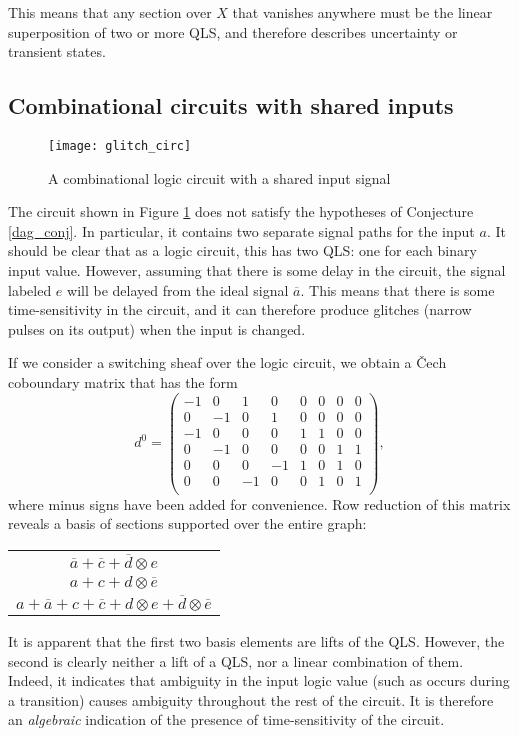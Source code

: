 \documentclass{amsart}
\theoremstyle{plain}
\theoremstyle{definition}
\begin{document}
This means that any section over $X$ that vanishes anywhere must be
the linear superposition of two or more QLS, and therefore describes
uncertainty or transient states.  

\subsection{Combinational circuits with shared inputs}

\begin{figure}
\begin{center}
\texttt{[image: glitch\_circ]}
\caption{A combinational logic circuit with a shared input signal}
\label{glitch_circ_fig}
\end{center}
\end{figure}

The circuit shown in Figure \ref{glitch_circ_fig} does not satisfy the
hypotheses of Conjecture \ref{dag_conj}.  In particular, it contains
two separate signal paths for the input $a$.  It should be clear that
as a logic circuit, this has two QLS: one for each binary input value.
However, assuming that there is some delay in the circuit, the signal
labeled $e$ will be delayed from the ideal signal $\overline{a}$.
This means that there is some time-sensitivity in the circuit, and it
can therefore produce glitches (narrow pulses on its output) when the
input is changed.

If we consider a switching sheaf over the logic circuit, we obtain a
\v{C}ech coboundary matrix that has the form
\begin{equation*}
d^0=\left(
\begin{array}{cc|cc|cccc}
-1& 0& 1& 0&  0& 0& 0& 0\\
0& -1& 0& 1& 0& 0& 0& 0\\
\hline
-1& 0& 0 &0&   1& 1& 0& 0\\
0& -1& 0& 0&   0& 0& 1& 1\\
0& 0&  0& -1&  1& 0 &1& 0\\
0& 0& -1& 0 &  0& 1& 0& 1\\
\end{array}
\right),
\end{equation*}
where minus signs have been added for convenience.  Row reduction of
this matrix reveals a basis of sections supported over the entire
graph:
\begin{center}
\begin{tabular}{c}
$\overline{a}+\overline{c}+\overline{d}\otimes e$\\
$a+c+d\otimes \overline{e}$\\
$a+\overline{a}+c+\overline{c}+d\otimes e+\overline{d}\otimes\overline{e}$\\
\end{tabular}
\end{center}
It is apparent that the first two basis elements are lifts of the
QLS.  However, the second is clearly neither a lift of a QLS, nor a
linear combination of them.  Indeed, it indicates that ambiguity in
the input logic value (such as occurs during a transition) causes
ambiguity throughout the rest of the circuit.  It is therefore an {\it
  algebraic} indication of the presence of time-sensitivity of the
circuit. 
\end{document}
